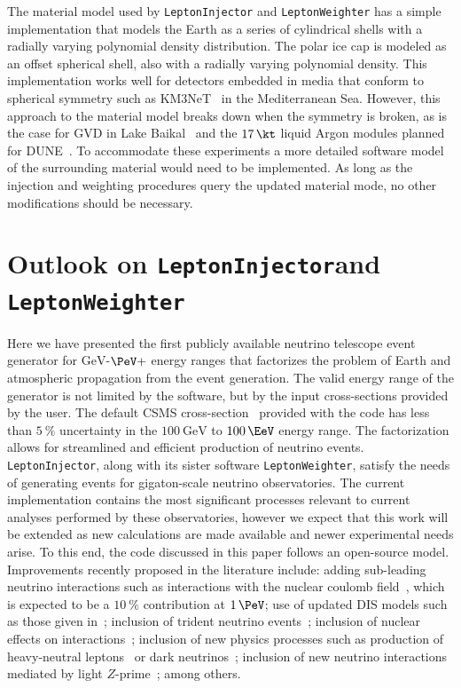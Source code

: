 \documentclass[main.tex]{subfiles}
\newcommand{\LeptonInjector}{\texttt{LeptonInjector}}
\newcommand{\LeptonWeighter}{\texttt{LeptonWeighter}}
\begin{document}
The material model used by \LeptonInjector{} and \LeptonWeighter{} has a simple implementation that models the Earth as a series of cylindrical shells with a radially varying polynomial density distribution.
The polar ice cap is modeled as an offset spherical shell, also with a radially varying polynomial density.
This implementation works well for detectors embedded in media that conform to spherical symmetry such as KM3NeT~\cite{Adrian-Martinez:2016fdl} in the Mediterranean Sea.
However, this approach to the material model breaks down when the symmetry is broken, as is the case for GVD in Lake Baikal~\cite{Avrorin:2018ijk} and the $\SI{17}\kt$ liquid Argon modules planned for DUNE~\cite{Abi:2020loh}.
To accommodate these experiments a more detailed software model of the surrounding material would need to be implemented.
As long as the injection and weighting procedures query the updated material mode, no other modifications should be necessary.

\section{Outlook on \LeptonInjector and \LeptonWeighter \label{sec:li_conclusions}}

Here we have presented the first publicly available neutrino telescope event generator for $\si\GeV$-$\si\PeV+$ energy ranges that factorizes the problem of Earth and atmospheric propagation from the event generation.
The valid energy range of the generator is not limited by the software, but by the input cross-sections provided by the user. 
The default CSMS cross-section~\cite{CooperSarkar:2011pa} provided with the code has less than $\SI{5}\percent$ uncertainty in the $\SI{100}\GeV$ to $\SI{100}\EeV$ energy range.
The factorization allows for streamlined and efficient production of neutrino events. 
\LeptonInjector{}, along with its sister software \LeptonWeighter{}, satisfy the needs of generating events for gigaton-scale neutrino observatories.
The current implementation contains the most significant processes relevant to current analyses performed by these observatories, however we expect that this work will be extended as new calculations are made available and newer experimental needs arise.
To this end, the code discussed in this paper follows an open-source model. 
Improvements recently proposed in the literature include: adding sub-leading neutrino interactions such as interactions with the nuclear coulomb field~\cite{Seckel:1997kk,Alikhanov:2014uja,Zhou:2019vxt,Beacom:2019pzs}, which is expected to be a $\SI{10}\percent$ contribution at $\SI{1}\PeV$; use of updated DIS models such as those given in~\cite{Garcia:2020jwr}; inclusion of trident neutrino events~\cite{Altmannshofer:2014pba,Ge:2017poy,Ballett:2018uuc,Altmannshofer:2019zhy,Beacom:2019pzs}; inclusion of nuclear effects on interactions~\cite{Bertone:2018dse}; inclusion of new physics processes such as production of heavy-neutral leptons~\cite{PhysRevLett.119.201804,Magill:2018jla,Cline:2020mdt} or dark neutrinos~\cite{Bertuzzo:2018itn,Blennow:2019fhy,Ballett:2019cqp,Coloma:2019qqj,Abdullahi:2020nyr}; inclusion of new neutrino interactions mediated by light $Z$-prime~\cite{Cherry:2016jol,Bakhti:2018avv,Ballett:2019xoj}; among others.
\end{document}
